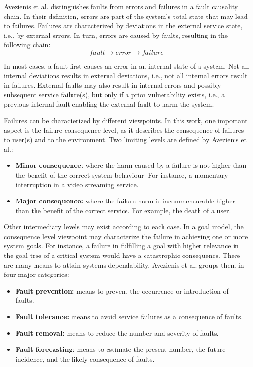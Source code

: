Avezienis et al. distinguishes faults from errors and failures in a fault causality chain. In their definition, errors are part of the system's total state that may lead to failures. Failures are characterized by deviations in the external service state, i.e., by external errors. In turn, errors are caused by faults, resulting in the following chain: $$ fault \rightarrow error \rightarrow failure$$ 

In most cases, a  fault first causes an error in an internal state of a system. Not all internal deviations results in external deviations, i.e., not all internal errors result in failures. External faults may also result in internal errors and possibly subsequent service failure(s), but only if a prior vulnerability exists, i.e., a previous internal fault enabling the external fault to harm the system. 

Failures can be characterized by different viewpoints. In this work, one important aspect is the failure consequence level, as it describes the consequence of failures to user(s) and to the environment. Two limiting levels are defined by Avezienis et al.:

\begin{itemize}

\item \textbf{Minor consequence:} where the harm caused by a failure is not higher than the benefit of the correct system behaviour. For instance, a momentary interruption in a video streaming service.
\medskip

\item \textbf{Major consequence:} where the failure harm is incommensurable higher than the benefit of the correct service. For example, the death of a user.
\medskip

\end{itemize}

Other intermediary levels may exist according to each case. In a goal model, the consequence level viewpoint may characterize the failure in achieving one or more system goals. For instance, a failure in fulfilling a goal with higher relevance in the goal tree of a critical system would have a catastrophic consequence. There are many means to attain systems dependability. Avezienis et al. groups them in four major categories:

\begin{itemize}

\item \textbf{Fault prevention:} means to prevent the occurrence or introduction of faults. 
\medskip

\item \textbf{Fault tolerance:} means to avoid service failures as a consequence of faults.
\medskip

\item \textbf{Fault removal:} means to reduce the number and severity of faults.
\medskip

\item \textbf{Fault forecasting:} means to estimate the present number, the future incidence, and the likely consequence of faults.

\end{itemize}

